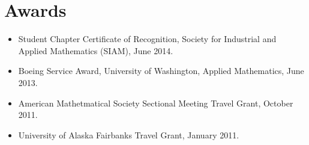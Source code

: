 \documentclass{article}
\begin{document}
\section*{Awards}

\begin{itemize}
  \setlength{\itemsep}{0pt}
  \item Student Chapter Certificate of Recognition, Society for
    Industrial and Applied Mathematics (SIAM), June 2014.
  \item Boeing Service Award, University of Washington, Applied
    Mathematics, June 2013.
  \item American Mathetmatical Society Sectional Meeting Travel Grant,
    October 2011.
  \item University of Alaska Fairbanks Travel Grant, January 2011.
\end{itemize}
\end{document}
